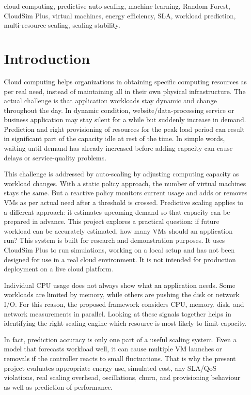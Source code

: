 \documentclass[10pt,journal,compsoc]{IEEEtran}
\begin{document}
\begin{IEEEkeywords}
cloud computing, predictive auto-scaling, machine learning, Random Forest, CloudSim Plus, virtual machines, energy efficiency, SLA, workload prediction, multi-resource scaling, scaling stability.
\end{IEEEkeywords}

\section{Introduction}
Cloud computing helps organizations in obtaining specific computing resources as per real need, instead of maintaining all in their own physical infrastructure. The actual challenge is that application workloads stay dynamic and change throughout the day. In dynamic condition, website/data-processing service or business application may stay silent for a while but suddenly increase in demand. Prediction and right provisioning of resources for the peak load period can result in significant part of the capacity idle at rest of the time. In simple words, waiting until demand has already increased before adding capacity can cause delays or service-quality problems.

This challenge is addressed by auto-scaling by adjusting computing capacity as workload changes. With a static policy approach, the number of virtual machines stays the same. But a reactive policy monitors current usage and adds or removes VMs as per actual need after a threshold is crossed. Predictive scaling applies to a different approach: it estimates upcoming demand so that capacity can be prepared in advance. This project explores a practical question: if future workload can be accurately estimated, how many VMs should an application run? This system is built for research and demonstration purposes. It uses CloudSim Plus to run simulations, working on a local setup and has not been designed for use in a real cloud environment. It is not intended for production deployment on a live cloud platform.

Individual CPU usage does not always show what an application needs. Some workloads are limited by memory, while others are pushing the disk or network I/O. For this reason, the proposed framework considers CPU, memory, disk, and network measurements in parallel. Looking at these signals together helps in identifying the right scaling engine which resource is most likely to limit capacity.

In fact, prediction accuracy is only one part of a useful scaling system. Even a model that forecasts workload well, it can cause multiple VM launches or removals if the controller reacts to small fluctuations. That is why the present project evaluates appropriate energy use, simulated cost, any SLA/QoS violations, real scaling overhead, oscillations, churn, and provisioning behaviour as well as prediction of performance.
\end{document}
